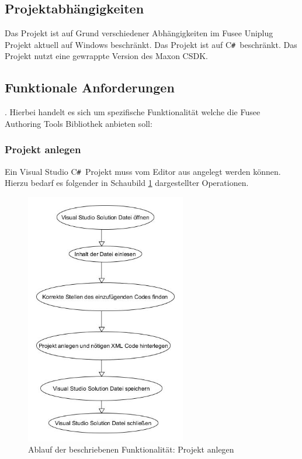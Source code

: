 \documentclass[pagesize, paper=a4, fontsize=12pt, titlepage=true, headings=small, headnosepline, abstractoff, liststotoc, nochapterprefix, plainheadsepline, twoside]{scrreprt}
\newcommand{\CSS}{C\texttt{\# }}
\newcommand{\CPP}{C\nolinebreak\hspace{-.05em}\raisebox{.4ex}{\tiny\bf +}\nolinebreak\hspace{-.10em}\raisebox{.4ex}{\tiny\bf +}}
\begin{document}
\subsection{Projektabhängigkeiten}
Das Projekt ist auf Grund verschiedener Abhängigkeiten im Fusee Uniplug Projekt aktuell auf Windows beschränkt.
Das Projekt ist auf \CSS beschränkt.
Das Projekt nutzt eine gewrappte Version des Maxon \CPP SDK.

\subsection{Funktionale Anforderungen}.
Hierbei handelt es sich um spezifische Funktionalität welche die Fusee Authoring Tools Bibliothek anbieten soll:

\subsubsection{Projekt anlegen}
Ein Visual Studio \CSS Projekt muss vom Editor aus angelegt werden können. Hierzu bedarf es folgender in Schaubild \ref{re:projektanlegen} dargestellter Operationen. 

\begin{figure}[ht]
	\centering
	\includegraphics[width=7cm]{Bilder/ProjektAnlegen.jpg}
	\caption{Ablauf der beschriebenen Funktionalität: Projekt anlegen}
	\label{re:projektanlegen}
\end{figure}
\end{document}
